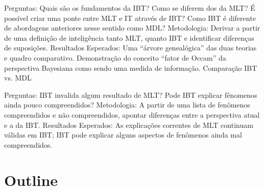 Perguntas:
Quais são os fundamentos da IBT? Como se diferem dos da MLT?
É possível criar uma ponte entre MLT e IT através de IBT? Como IBT é diferente de abordagens anteriores nesse sentido como MDL?
Metodologia:
Derivar a partir de uma definição de inteligência tanto MLT, quanto IBT e identificar diferenças de  suposições.
Resultados Esperados:
Uma “árvore genealógica” das duas teorias e quadro comparativo.
Demonstração do conceito “fator de Occam” da perspectiva Bayesiana como sendo uma medida de informação.
Comparação IBT vs. MDL

Perguntas:
IBT invalida algum resultado de MLT?
Pode IBT explicar fênomenos ainda pouco compreendidos?
Metodologia:
A partir de uma lista de fenômenos compreendidos e não compreendidos, apontar diferenças entre a perspectiva atual e a da IBT.
Resultados Esperados:
As explicações correntes de MLT continuam válidas em IBT;
IBT pode explicar alguns aspectos de fenômenos ainda mal compreendidos.



\section{Outline}


